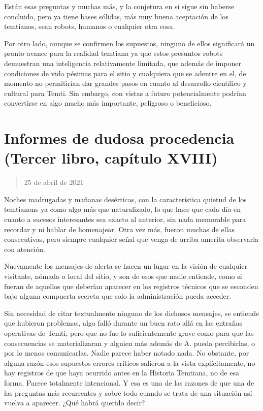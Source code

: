 \documentclass[
]{book}
\begin{document}
Están esas preguntas y muchas más, y la conjetura en sí sigue sin haberse concluido, pero ya tiene bases sólidas, más muy buena aceptación de los temtianos, sean robots, humanos o cualquier otra cosa.

Por otro lado, aunque se confirmen los supuestos, ninguno de ellos significará un pronto avance para la realidad temtiana ya que estos presuntos robots demuestran una inteligencia relativamente limitada, que además de imponer condiciones de vida pésimas para el sitio y cualquiera que se adentre en el, de momento no permitirían dar grandes pasos en cuanto al desarrollo científico y cultural para Temti. Sin embargo, con vistas a futuro potencialmente podrían convertirse en algo mucho más importante, peligroso o beneficioso.

\hypertarget{informes-de-dudosa-procedencia-tercer-libro-capuxedtulo-xviii}{%
\section{Informes de dudosa procedencia (Tercer libro, capítulo XVIII)}\label{informes-de-dudosa-procedencia-tercer-libro-capuxedtulo-xviii}}

\begin{quote}
25 de abril de 2021
\end{quote}

Noches madrugadas y mañanas desérticas, con la característica quietud de los temtianons ya como algo más que naturalizado, lo que hace que cada día en cuanto a sucesos interesantes sea exacto al anterior, sin nada memorable para recordar y ni hablar de homenajear. Otra vez más, fueron muchas de ellas consecutivas, pero siempre cualquier señal que venga de arriba amerita observarla con atención.

Nuevamente los mensajes de alerta se hacen un lugar en la visión de cualquier visitante, nómada o local del sitio, y son de esos que nadie entiende, como si fueran de aquellos que deberían aparecer en los registros técnicos que se esconden bajo alguna compuerta secreta que solo la administración pueda acceder.

Sin necesidad de citar textualmente ninguno de los dichosos mensajes, se entiende que hubieron problemas, algo falló durante un buen rato allá en las entrañas operativas de Temti, pero que no fue lo suficientemente grave como para que las consecuencias se materializaran y alguien más además de A. pueda percibirlas, o por lo menos comunicarlas. Nadie parece haber notado nada. No obstante, por alguna razón esos supuestos errores críticos salieron a la vista explícitamente, no hay registros de que haya ocurrido antes en la Historia Temtiana, no de esa forma. Parece totalmente intencional. Y esa es una de las razones de que una de las preguntas más recurrentes y sobre todo cuando se trata de una situación así vuelva a aparecer. ¿Qué habrá querido decir?
\end{document}

